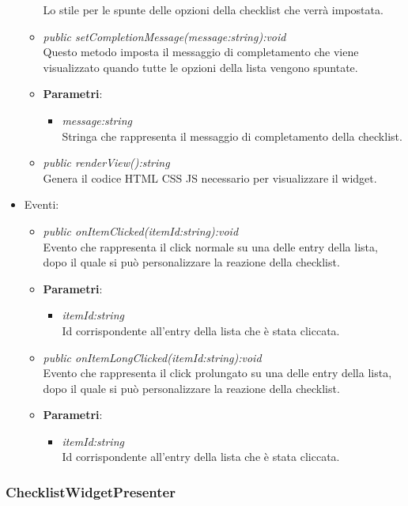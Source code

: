 \begin{itemize}
\begin{itemize}
{\begin{itemize}
		Lo stile per le spunte delle opzioni della checklist che verrà impostata.
		\end{itemize}} 
	\item \textit{public setCompletionMessage(message:string):void}\\
	Questo metodo imposta il messaggio di completamento che viene visualizzato quando tutte le opzioni della lista vengono spuntate.
		\item{\textbf{Parametri}: \begin{itemize}
		\item \textit{message:string}\\
		Stringa che rappresenta il messaggio di completamento della checklist.
		\end{itemize}}
	\item \textit{public renderView():string}\\
	Genera il codice HTML CSS JS necessario per visualizzare il widget.
	\end{itemize}
\item{Eventi}:
	\begin{itemize}
	\item \textit{public onItemClicked(itemId:string):void}\\
	Evento che rappresenta il click normale su una delle entry della lista, dopo il quale si può personalizzare la reazione della checklist.
		\item{\textbf{Parametri}: \begin{itemize}
		\item \textit{itemId:string}\\
		Id corrispondente all'entry della lista che è stata cliccata.
		\end{itemize}}
	\item \textit{public onItemLongClicked(itemId:string):void}\\
	Evento che rappresenta il click prolungato su una delle entry della lista, dopo il quale si può personalizzare la reazione della checklist.
		\item{\textbf{Parametri}: \begin{itemize}
		\item \textit{itemId:string}\\
		Id corrispondente all'entry della lista che è stata cliccata.
		\end{itemize}}
	\end{itemize}
\end{itemize}

\subsubsection{ChecklistWidgetPresenter}

